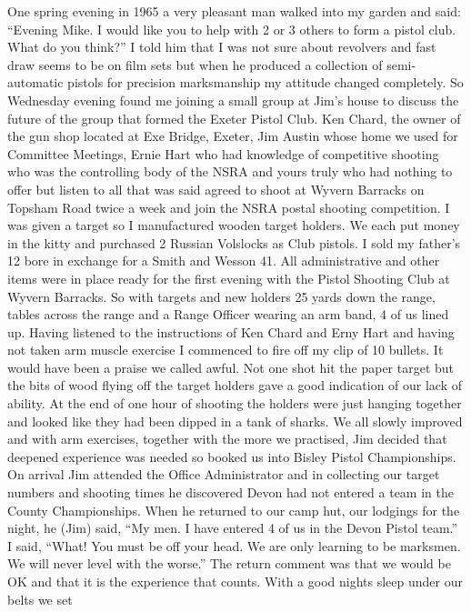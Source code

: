 One spring evening in 1965 a very pleasant man walked into my garden and said:
``Evening Mike. I would like you to help with 2 or 3 others to form a pistol
club. What do you think?'' I told him that I was not sure about revolvers and
fast draw seems to be on film sets but when he produced a collection of
semi-automatic pistols for precision marksmanship my attitude changed
completely. So Wednesday evening found me joining a small group at Jim's house
to discuss the future of the group that formed the Exeter Pistol Club. Ken
Chard, the owner of the gun shop located at Exe Bridge, Exeter, Jim Austin
whose home we used for Committee Meetings, Ernie Hart who had knowledge of
competitive shooting who was the controlling body of the NSRA and yours truly
who had nothing to offer but listen to all that was said agreed to shoot at
Wyvern Barracks on Topsham Road twice a week and join the NSRA postal shooting
competition. I was given a target so I manufactured wooden target holders. We
each put money in the kitty and purchased 2 Russian Volslocks as Club pistols.
I sold my father's 12 bore in exchange for a Smith and Wesson 41. All
administrative and other items were in place ready for the first evening with
the Pistol Shooting Club at Wyvern Barracks. So with targets and new holders 25
yards down the range, tables across the range and a Range Officer wearing an
arm band, 4 of us lined up. Having listened to the instructions of Ken Chard
and Erny Hart and having not taken arm muscle exercise I commenced to fire off
my clip of 10 bullets. It would have been a praise we called awful. Not one
shot hit the paper target but the bits of wood flying off the target holders
gave a good indication of our lack of ability. At the end of one hour of
shooting the holders were just hanging together and looked like they had been
dipped in a tank of sharks. We all slowly improved and with arm exercises,
together with the more we practised, Jim decided that deepened experience was
needed so booked us into Bisley Pistol Championships. On arrival Jim attended
the Office Administrator and in collecting our target numbers and shooting
times he discovered Devon had not entered a team in the County Championships.
When he returned to our camp hut, our lodgings for the night, he (Jim) said,
``My men. I have entered 4 of us in the Devon Pistol team.'' I said, ``What!
You must be off your head. We are only learning to be marksmen. We will never
level with the worse.'' The return comment was that we would be OK and that it
is the experience that counts. With a good nights sleep under our belts we set

